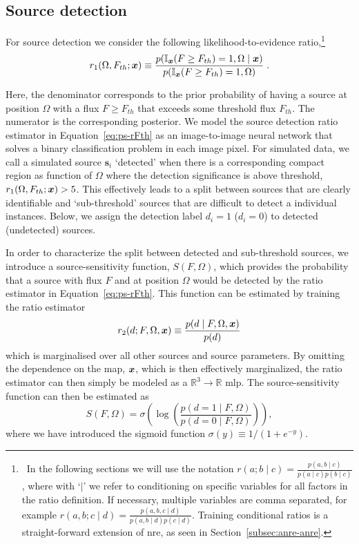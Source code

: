\subsection{Source detection} \label{subsec:ps-detection}
For source detection we consider the following likelihood-to-evidence ratio,\footnote{
    \ In the following sections we will use the notation 
    $r(a; b\mid c) = \frac{p(a,b\mid c)}{p(a\mid c)p(b\mid c)}$, 
    where with `$\mid $' we refer to conditioning on specific variables for all factors in the ratio definition. If necessary, multiple variables are comma separated, for example $r(a, b; c\mid  d) = \frac{p(a, b, c\mid d)}{p(a, b\mid d)p(c\mid d)}$. Training conditional ratios is a straight-forward extension of \gls*{nre}, as seen in Section~\ref{subsec:anre-anre}.
}
\begin{equation}
    { r_1(\Omega, F_{th}; \ensuremath{\bm{x}})} 
    \equiv \frac{
    p(\mathbb{I}_{\bm{x}}(F \geq F_{th})=1, \Omega\mid \bm{x})
    }{
    p(\mathbb{I}_{\bm{x}}(F \geq F_{th})=1, \Omega)
    }\;.
    \label{eq:ps-rFth}
\end{equation}

Here, the denominator corresponds to the prior probability of having a source at position $\Omega$ with a flux $F\geq F_{th}$ that exceeds some threshold flux $F_{th}$.  The numerator is the corresponding posterior. We model the source detection ratio estimator in Equation~\eqref{eq:ps-rFth} as an image-to-image neural network that solves a binary classification problem in each image pixel. 
For simulated data, we call a simulated source $\boldsymbol{s}_i$ `detected' when there is a corresponding compact region as function of $\Omega$ where the detection significance is above threshold, ${ r_1(\Omega, F_{th}; \bm{x})} > 5$. This effectively leads to a split between sources that are clearly identifiable and `sub-threshold' sources that are difficult to detect a individual instances.
Below, we assign the detection label $d_i = 1$ ($d_i = 0$) to detected (undetected) sources.

In order to characterize the split between detected and sub-threshold sources, we introduce a source-sensitivity function, $S(F, \Omega)$, which provides the probability that a source with flux $F$ and at position $\Omega$ would be detected by the ratio estimator in Equation~\eqref{eq:ps-rFth}.  This function can be estimated by training the ratio estimator
\begin{equation}
    { r_2(d;F, \Omega, \ensuremath{\bm{x}})}
    \equiv \frac{p(d\mid  F, \Omega, \bm{x})}
    {p(d)}
    \label{eq:ps-rd}
\end{equation}
which is marginalised over all other sources and source parameters. By omitting the dependence on the map, $\bm{x}$, which is then effectively marginalized, the ratio estimator can then simply be modeled as a $\mathbb{R}^3 \to \mathbb{R}$ \gls*{mlp}. The source-sensitivity function can then be estimated as 
\begin{equation}
S(F, \Omega) = \sigma\left(\log \left(\frac{p(d=1\mid F, \Omega)}{p(d=0\mid F, \Omega)}\right)\right),
\end{equation}
where we have introduced the sigmoid function $\sigma(y) \equiv 1 / (1 + e^{-y})$. 

